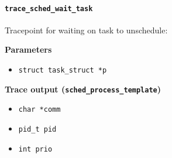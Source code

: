 \paragraph{\texttt{trace\_sched\_wait\_task}}
Tracepoint for waiting on task to unschedule:

\textbf{Parameters}
\begin{itemize}
    \item \verb|struct task_struct *p|
\end{itemize}

\textbf{Trace output (\texttt{sched\_process\_template})}
\begin{itemize}
    \item \verb|char *comm|
    \item \verb|pid_t pid|
    \item \verb|int prio|
\end{itemize}

